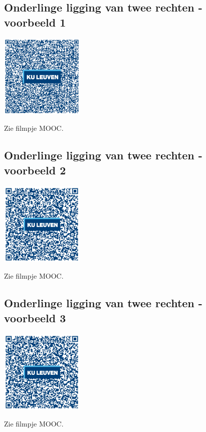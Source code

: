 \subsection{Onderlinge ligging van twee rechten - voorbeeld 1}
\begin{minipage}{.25\linewidth}
	\raggedright
	\includegraphics[width=4cm]{4_opp_inhoud_an_meetk/inputs/QR_Code_ONDERLINGELIGGINGVB_module4new}
\end{minipage}
\begin{minipage}{.7\linewidth}
	Zie filmpje MOOC.
\end{minipage}

\subsection{Onderlinge ligging van twee rechten - voorbeeld 2}
\begin{minipage}{.25\linewidth}
	\raggedright
	\includegraphics[width=4cm]{4_opp_inhoud_an_meetk/inputs/QR_Code_ONDERLINGELIGGINGVB2_module4new}
\end{minipage}
\begin{minipage}{.7\linewidth}
	Zie filmpje MOOC.
\end{minipage}

\subsection{Onderlinge ligging van twee rechten - voorbeeld 3}
\begin{minipage}{.25\linewidth}
	\raggedright
	\includegraphics[width=4cm]{4_opp_inhoud_an_meetk/inputs/QR_Code_ONDERLINGELIGGINGVB3_module4new}
\end{minipage}
\begin{minipage}{.7\linewidth}
	Zie filmpje MOOC.
\end{minipage}

